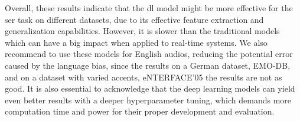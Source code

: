 Overall, these results indicate that the \ac{dl} model might be more effective for the \ac{ser} task on different datasets, due to its effective feature extraction and generalization capabilities. However, it is slower than the traditional models which can have a big impact when applied to real-time systems. We also recommend to use these models for English audios, reducing the potential error caused by the language bias, since the results on a German dataset, EMO-DB, and on a dataset with varied accents, eNTERFACE'05 the results are not as good. It is also essential to acknowledge that the deep learning models can yield even better results with a deeper hyperparameter tuning, which demands more computation time and power for their proper  development and evaluation.


\begin{table}[H]
	\centering
	\caption{Final models trained on \ac{iemo} and evaluated on different datasets.}
	\label{final_models}
\end{table}


